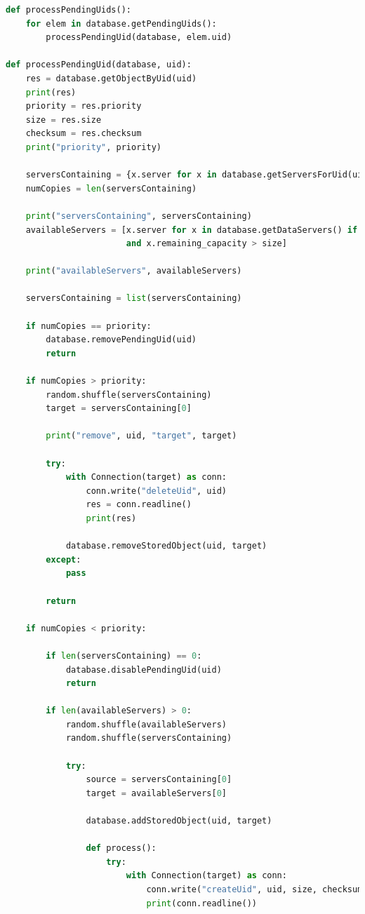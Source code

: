 \documentclass{article}
\begin{document}
\begin{lstlisting}[language=Python, title=Mantenimento del grado di replicazione dei documenti]
def processPendingUids():
    for elem in database.getPendingUids():
        processPendingUid(database, elem.uid)

def processPendingUid(database, uid):
    res = database.getObjectByUid(uid)
    print(res)
    priority = res.priority
    size = res.size
    checksum = res.checksum
    print("priority", priority)

    serversContaining = {x.server for x in database.getServersForUid(uid)}
    numCopies = len(serversContaining)

    print("serversContaining", serversContaining)
    availableServers = [x.server for x in database.getDataServers() if x.server not in serversContaining
                        and x.remaining_capacity > size]

    print("availableServers", availableServers)

    serversContaining = list(serversContaining)

    if numCopies == priority:
        database.removePendingUid(uid)
        return

    if numCopies > priority:
        random.shuffle(serversContaining)
        target = serversContaining[0]

        print("remove", uid, "target", target)

        try:
            with Connection(target) as conn:
                conn.write("deleteUid", uid)
                res = conn.readline()
                print(res)

            database.removeStoredObject(uid, target)
        except:
            pass

        return

    if numCopies < priority:

        if len(serversContaining) == 0:
            database.disablePendingUid(uid)
            return

        if len(availableServers) > 0:
            random.shuffle(availableServers)
            random.shuffle(serversContaining)

            try:
                source = serversContaining[0]
                target = availableServers[0]

                database.addStoredObject(uid, target)

                def process():
                    try:
                        with Connection(target) as conn:
                            conn.write("createUid", uid, size, checksum)
                            print(conn.readline())


\end{lstlisting}
\end{document}
